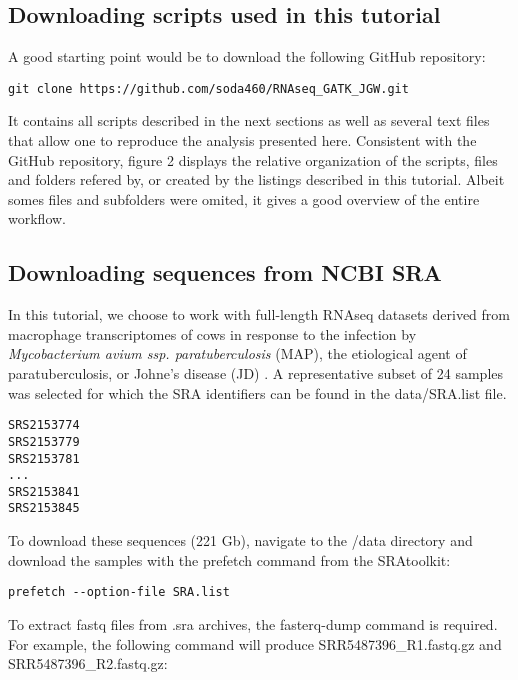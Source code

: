 \subsection{Downloading scripts used in this tutorial}

A good starting point would be to download the following GitHub repository:

\begin{verbatim}
git clone https://github.com/soda460/RNAseq_GATK_JGW.git
\end{verbatim}

It contains all scripts described in the next sections as well as several text files that allow one to reproduce the analysis presented here. Consistent with the GitHub repository, figure 2 displays the relative organization of the scripts, files and folders refered by, or created by the listings described in this tutorial. Albeit somes files and subfolders were omited, it gives a good overview of the entire workflow.





\subsection{Downloading sequences from NCBI SRA}

In this tutorial, we choose to work with full-length RNAseq datasets derived from macrophage transcriptomes of cows in response to the infection by \textit{Mycobacterium avium ssp. paratuberculosis } (MAP), the etiological agent of paratuberculosis, or Johne’s disease (JD) \cite{Ariel2021}. A representative subset of 24 samples was selected for which the SRA identifiers can be found in the data/SRA.list file.

\begin{verbatim}
SRS2153774
SRS2153779
SRS2153781
...
SRS2153841
SRS2153845
\end{verbatim}


To download these sequences (221 Gb), navigate to the /data directory and download the samples with the prefetch command from the SRAtoolkit:

\begin{verbatim}
prefetch --option-file SRA.list
\end{verbatim}

To extract fastq files from .sra archives, the fasterq-dump command is required. For example, the following command will produce SRR5487396\_R1.fastq.gz and SRR5487396\_R2.fastq.gz:

